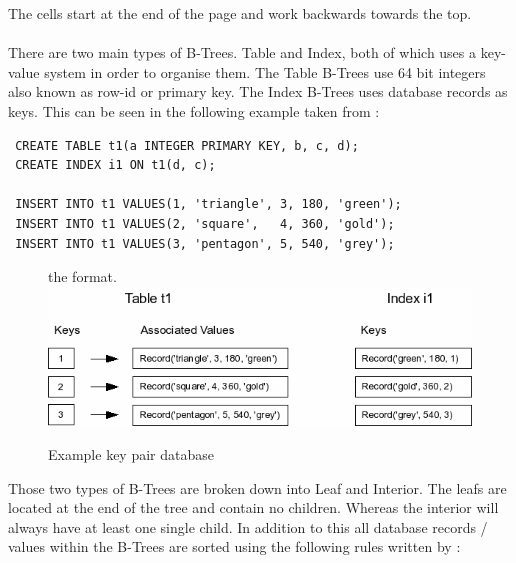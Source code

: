 The cells start at the end of the page and work backwards towards the top.
\\\\
There are two main types of B-Trees. Table and Index, both of which uses a key-value system in order to organise them. The Table B-Trees use 64 bit integers also known as row-id or primary key. The Index B-Trees uses database records as keys. This can be seen in the following example taken from \cite{sqliteray}:

\begin{lstlisting}
 CREATE TABLE t1(a INTEGER PRIMARY KEY, b, c, d);
 CREATE INDEX i1 ON t1(d, c);

 INSERT INTO t1 VALUES(1, 'triangle', 3, 180, 'green');
 INSERT INTO t1 VALUES(2, 'square',   4, 360, 'gold');
 INSERT INTO t1 VALUES(3, 'pentagon', 5, 540, 'grey');
\end{lstlisting}

\begin{figure}[H]the format.
	\centering
	\includegraphics[scale=0.5]{images/examplepop.png}
	\caption{Example key pair database \citep{sqliteray}}
	\label{fig:sqlite_key_pair}
\end{figure}

Those two types of B-Trees are broken down into Leaf and Interior. The leafs are located at the end of the tree and contain no children. Whereas the interior will always have at least one single child. In addition to this all database records / values within the B-Trees are sorted using the following rules written by \cite{sqliteray}:


